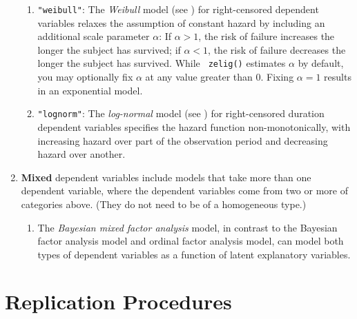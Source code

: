 \begin{enumerate}
\begin{enumerate}
  \item {\tt "weibull"}: The {\it Weibull} model (see )
  for right-censored dependent variables relaxes the
  assumption of constant hazard by including an additional scale
  parameter $\alpha$: If $\alpha > 1$, the risk of failure increases
  the longer the subject has survived; if $\alpha < 1$, the risk of
  failure decreases the longer the subject has survived.  While {\tt
  zelig()} estimates $\alpha$ by default, you may optionally fix
  $\alpha$ at any value greater than 0.  Fixing $\alpha = 1$ results
  in an exponential model.

  \item {\tt "lognorm"}: The {\it log-normal} model (see
  ) for right-censored duration dependent variables
  specifies the hazard function non-monotonically, with increasing
  hazard over part of the observation period and decreasing hazard
  over another.

\end{enumerate}

\item {\bf Mixed} dependent variables include models that take more
than one dependent variable, where the dependent variables come from
two or more of categories above.  (They do not need
to be of a homogeneous type.)
\begin{enumerate}
\item The {\it Bayesian mixed factor analysis} model, in contrast to the Bayesian factor
analysis model and ordinal factor analysis model, can model both types
of dependent variables as a function of latent explanatory variables.
\end{enumerate}

\end{enumerate}

\section{Replication Procedures} 

